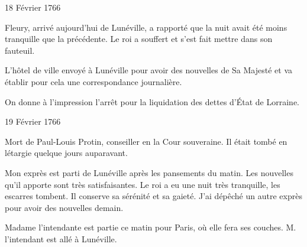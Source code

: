                      \begin{diary}{18 Février 1766}{}


                           Fleury, arrivé aujourd'hui de
                              Lunéville,
                           a rapporté que la nuit avait été moins
                           tranquille que la précédente. Le
                              roi a souffert
                           et s'est fait mettre dans son fauteuil. \bigskip



                           L'hôtel de ville envoyé à Lunéville pour avoir
                           des nouvelles de Sa Majesté et va établir pour
                           cela une correspondance journalière. \bigskip


                         On donne à l'impression l'arrêt pour la
                           liquidation des dettes d’État de Lorraine. \bigskip


                     \end{diary}

                     \begin{diary}{19 Février 1766}{}

                         Mort de Paul-Louis Protin, conseiller en la
                              Cour souveraine. Il était tombé en létargie
                           quelque jours auparavant. \bigskip


                         Mon exprès est parti de Lunéville après
                           les pansements du matin. Les nouvelles qu'il apporte sont très satisfaisantes. Le
                              roi a
                           eu une nuit très tranquille, les escarres
                           tombent. Il conserve sa sérénité et sa
                           gaieté. J'ai dépêché un autre exprès
                           pour avoir des nouvelles demain. \bigskip



                           Madame l'intendante est partie ce matin
                           pour Paris, où elle fera ses
                           couches. M.
                              l'intendant est allé à Lunéville. \bigskip


                     \end{diary}

